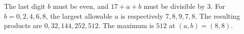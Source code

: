 The last digit $b$ must be even, and $17+a+b$ must be divisible by 3. For $b=0,2,4,6,8$, the largest allowable $a$ is respectively $7,8,9,7,8$. The resulting products are $0,32,144,252,512$. The maximum is $\boxed{512}$ at $(a,b)=(8,8)$.
